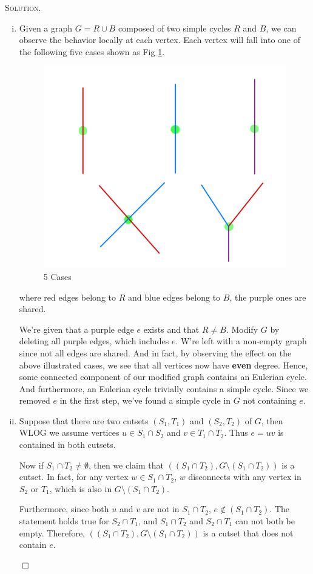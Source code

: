 \documentclass[12pt, a4paper, oneside]{ctexart}
\newenvironment{solution}{%
	\par\noindent\textsc{Solution. }\ignorespaces
}{%
	\hfill$\qed$\par
}
\begin{document}
	\begin{solution}
        
		\begin{enumerate}[(i)]
			\item Given a graph $G = R \cup B$ composed of two simple cycles  
			$R$ and $B$, we can observe the behavior locally at each vertex. Each vertex will fall into one of the following five cases shown as Fig \ref{fig:5C}.
			\begin{figure}[H]
				\small
				\centering
				\includegraphics[width=0.5\columnwidth]{figure/5C.jpg}
				\caption{5 Cases}
				\label{fig:5C}
			\end{figure}

			where red edges belong to $R$ and blue edges belong to $B$, the purple ones are shared.

			We're given that a purple edge  $e$ exists and that  $R \neq B$. Modify $G$ by deleting all purple edges, which includes  
			$e$. W're left with a non-empty graph since not all edges are shared. And in fact, by observing the effect on the above illustrated cases, we see that all vertices now have \textbf{even} degree.
			Hence, some connected component of our modified graph contains an Eulerian cycle. And furthermore, an Eulerian cycle trivially contains a simple cycle. Since we removed  $e$
 			in the first step, we've found a simple cycle in  $G$ not containing  $e$.
			\item Suppose that there are two cutsets $(S_1, T_1)$ and $(S_2, T_2)$ of $G$, then WLOG we assume vertices $u \in S_1\cap S_2$
			and $v \in T_1\cap T_2$. Thus $e = uv$ is contained in both cutsets.

			Now if $S_1\cap T_2\neq\emptyset$, then we claim that $((S_1\cap T_2), G \setminus (S_1\cap T_2))$ is a cutset.
			In fact, for any vertex $w \in S_1 \cap T_2$, $w$ disconnects with any vertex in $S_2$ or $T_1$, which is also in 
			$G \setminus (S_1\cap T_2)$.

			Furthermore, since both $u$ and $v$ are not in $S_1\cap T_2$, $e\notin (S_1\cap T_2)$. The statement holds true for
			$S_2 \cap T_1$, and $S_1\cap T_2$ and $S_2 \cap T_1$ can not both be empty. Therefore, $((S_1\cap T_2), G \setminus (S_1\cap T_2))$ is a cutset that
			does not contain $e$.
		\end{enumerate}

    \end{solution}
		
\end{document}
